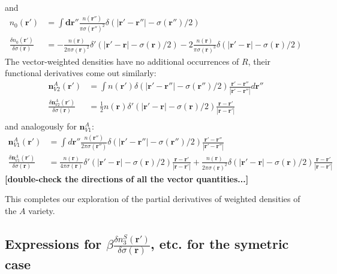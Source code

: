 \documentclass[letterpaper,twocolumn,amsmath,amssymb,jcp,10pt,aip]{revtex4-1}
\newcommand{\red}[1]{{\bf \color{red} #1}}
\newcommand{\rr}{\textbf{r}}
\newcommand{\fixme}[1]{\red{[#1]}}
\begin{document}
\begin{widetext}
\begin{align}
\end{align}
and
\begin{align}
  n_0(\rr') &= \int \mathbf{dr''} \frac{n(\rr'')}{\pi \sigma(\rr'')^2}
  \delta(|\rr'-\rr''| - \sigma(\rr'')/2) \\
  \frac{\delta n_0(\rr')}{\delta \sigma(\rr)}
  &= -\frac{n(\rr)}{2\pi
    \sigma(\rr)^2}\delta'(|\rr'-\rr| - \sigma(\rr)/2)
  -
  2 \frac{n(\rr)}{\pi
    \sigma(\rr)^3}\delta(|\rr'-\rr| - \sigma(\rr)/2)
\end{align}
The vector-weighted densities have no additional occurrences of $R$,
their functional derivatives come out similarly:
\begin{align}
  \mathbf{n}_{V2}^{A}(\rr') &= \int n(\rr') \delta(|\rr' - \rr''| - \sigma(\rr'')/2)
    \frac{\rr'-\rr''}{|\rr'-\rr''|} d \rr''\\
  \frac{\delta \mathbf{n}_{V2}^{A}(\rr')}{\delta \sigma(\rr)} &= \frac 12 n(\rr) \delta'(|\rr' - \rr| - \sigma(\rr)/2)
    \frac{\rr-\rr'}{|\rr-\rr'|}\\
\end{align}
and analogously for $\mathbf{n}_{V1}^A$:
\begin{align}
  \mathbf{n}_{V1}^A(\rr') &= \int d\rr'' \frac{n(\rr'')}{2\pi \sigma(\rr'')}
  \delta(|\mathbf{r'}-\rr''| - \sigma(\rr'')/2) \frac{\rr'-\rr''}{|\rr'-\rr''|}\\
  \frac{\delta \mathbf{n}_{V1}^A(\rr')}{\delta \sigma(\rr)}
  &= \frac{n(\rr)}{4\pi
    \sigma(\rr)}\delta'(|\rr'-\rr| - \sigma(\rr)/2) \frac{\rr-\rr'}{|\rr-\rr'|}
  +
  \frac{n(\rr)}{2\pi
    \sigma(\rr)^2}\delta(|\rr'-\rr| - \sigma(\rr)/2) \frac{\rr-\rr'}{|\rr-\rr'|}
\end{align}
\fixme{double-check the directions of all the vector quantities...}

This completes our exploration of the partial derivatives of weighted
densities of the $A$ variety.


\subsection{Expressions for $\beta\frac{\delta
    n_3^{S}(\mathbf{r}')}{\delta \sigma(\mathbf{r})}$, etc. for the
  symetric case}\label{appendix:g-S}


\end{widetext}
\end{document}

